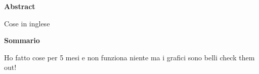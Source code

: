 \vspace*{\fill}

\begingroup

    \begin{center}
        {{\large{\bf Abstract}}}
    \end{center}


    \begin{center}
        Cose in inglese
    \end{center}

    \vspace{40mm}

    \begin{center}
        {{\large{\bf Sommario}}}
    \end{center}


    \begin{center}
        Ho fatto cose per 5 mesi e non funziona niente ma i grafici sono belli check them out!
    \end{center}

\endgroup

\vspace*{\fill}


